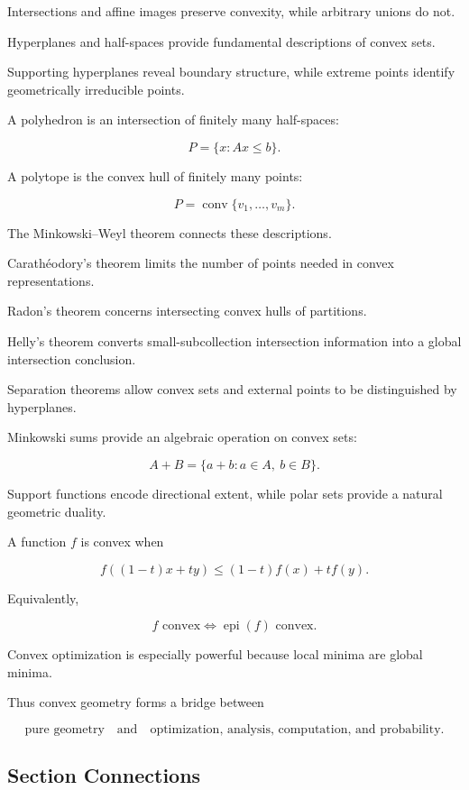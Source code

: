 Intersections and affine images preserve convexity, while arbitrary unions
do not.

Hyperplanes and half-spaces provide fundamental descriptions of convex
sets.

Supporting hyperplanes reveal boundary structure, while extreme points
identify geometrically irreducible points.

A polyhedron is an intersection of finitely many half-spaces:

\[
\boxed{
P=\{x:Ax\leq b\}.
}
\]

A polytope is the convex hull of finitely many points:

\[
\boxed{
P=\operatorname{conv}\{v_1,\ldots,v_m\}.
}
\]

The Minkowski--Weyl theorem connects these descriptions.

Carath\'eodory's theorem limits the number of points needed in convex
representations.

Radon's theorem concerns intersecting convex hulls of partitions.

Helly's theorem converts small-subcollection intersection information into a
global intersection conclusion.

Separation theorems allow convex sets and external points to be distinguished
by hyperplanes.

Minkowski sums provide an algebraic operation on convex sets:

\[
\boxed{
A+B=\{a+b:a\in A,\ b\in B\}.
}
\]

Support functions encode directional extent, while polar sets provide a
natural geometric duality.

A function \(f\) is convex when

\[
\boxed{
f((1-t)x+ty)
\leq
(1-t)f(x)+tf(y).
}
\]

Equivalently,

\[
\boxed{
f\text{ convex}
\iff
\operatorname{epi}(f)\text{ convex}.
}
\]

Convex optimization is especially powerful because local minima are global
minima.

Thus convex geometry forms a bridge between

\[
\boxed{
\text{pure geometry}
\quad\text{and}\quad
\text{optimization, analysis, computation, and probability}.
}
\]

\subsection{Section Connections}
\label{subsec:convex-geometry-connections}


